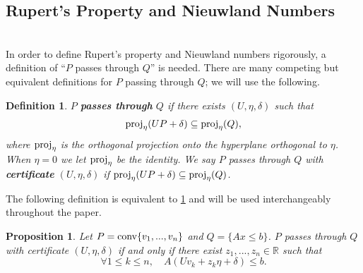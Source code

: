 \documentclass[a4paper]{amsart}
\newtheorem{prop}[thm]{Proposition}
\newtheorem{dfn}[thm]{Definition}
\theoremstyle{remark}
\begin{document}
\subsection{Rupert's Property and Nieuwland Numbers} \label{subsec:definitions}
\hfill \\
In order to define Rupert's property and Nieuwland numbers rigorously, a definition of ``$P$ passes through $Q$'' is needed. There are many competing but equivalent definitions for $P$ passing through $Q$; we will use the following.
\begin{dfn} \label{def:pass_through}
	$P$ \textbf{passes through} $Q$ if there exists $(U,\eta,\delta)$ such that $$\textup{proj}_{\eta}(UP+\delta)\subseteq \textup{proj}_{\eta}(Q),$$where $\textup{proj}_{\eta}$ is the orthogonal projection onto the hyperplane orthogonal to $\eta$. When $\eta=0$ we let $\textup{proj}_\eta$ be the identity. We say $P$ passes through $Q$ with \textbf{certificate} $(U,\eta,\delta)$ if $\textup{proj}_{\eta}(UP+\delta)\subseteq \textup{proj}_{\eta}(Q)$.\\
\end{dfn}
\noindent
The following definition is equivalent to \ref{def:pass_through} and will be used interchangeably throughout the paper.
\begin{prop} \label{proposition:equivalent_pass_through_definition}
	Let $P=\textup{conv}\{v_1,...,v_n\}$ and $Q=\{Ax\leq b\}$. $P$ passes through $Q$ with certificate $(U,\eta,\delta)$ if and only if there exist $z_1,...,z_n\in\mathbb{R}$ such that
	$$\forall 1\leq k\leq n, \quad A(Uv_k+z_k\eta+\delta)\leq b.$$
\end{prop}
\end{document}
